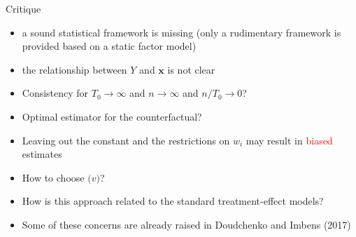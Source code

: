 \documentclass{beamer}
\newcommand{\red}[1]{\textcolor{red}{#1}}
\begin{document}


\begin{frame}{Critique}

\begin{itemize}
\item a sound statistical framework is missing (only a rudimentary framework is provided based on a static factor model)
\item the relationship between $Y$ and $\bm{x}$ is not clear
\item Consistency for $T_0\to \infty$ and $n\to \infty$ and $n/T_0\to 0$?
\item Optimal estimator for the counterfactual?
\item Leaving out the constant and the restrictions on $w_i$ may result in \red{biased} estimates
\item How to choose $\bm(v)$?
\item How is this approach related to the standard treatment-effect models?
\item Some of these concerns are already raised in Doudchenko and Imbens (2017)
\end{itemize}
\end{frame}
\end{document}
